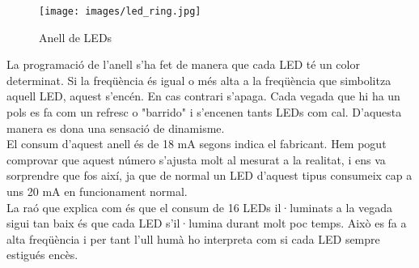 \begin{figure}[H]
\begin{center}
\texttt{[image: images/led\_ring.jpg]}
\end{center}
\caption{Anell de LEDs}
\label{fig:ledring}
\end{figure}
%
\noindent La programació de l'anell s'ha fet de manera que cada LED té un color determinat. Si la freqüència és igual o més alta a la freqüència que simbolitza aquell LED, aquest s'encén. En cas contrari s'apaga. Cada vegada que hi ha un pols es fa com un refresc o "barrido" i s'encenen tants LEDs com cal. D'aquesta manera es dona una sensació de dinamisme.\\
\newline El consum d'aquest anell és de 18 mA segons indica el fabricant. Hem pogut comprovar que aquest número s'ajusta molt al mesurat a la realitat, i ens va sorprendre que fos així, ja que de normal un LED d'aquest tipus consumeix cap a uns 20 mA en funcionament normal.\\
\newline La raó que explica com és que el consum de 16 LEDs il·luminats a la vegada sigui tan baix és que cada LED s'il·lumina durant molt poc temps. Això es fa a alta freqüència i per tant l'ull humà ho interpreta com si cada LED sempre estigués encès.

